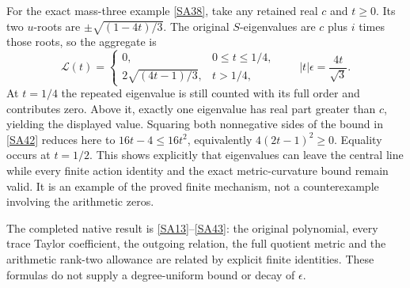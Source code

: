 \documentclass[11pt]{article}
\begin{document}
For the exact mass-three example \eqref{SA38}, take
any retained real $c$ and $t\geq0$. Its two $u$-roots
are $\pm\sqrt{(1-4t)/3}$. The original $S$-eigenvalues
are $c$ plus $i$ times those roots, so the aggregate is
\begin{equation}\tag{SA43}\label{SA43}
\mathcal L(t)=
\begin{cases}
0,&0\leq t\leq1/4,\\
2\sqrt{(4t-1)/3},&t>1/4,
\end{cases}
\qquad |t|\epsilon=\frac{4t}{\sqrt3}.
\end{equation}
At $t=1/4$ the repeated eigenvalue is still counted with
its full order and contributes zero. Above it, exactly
one eigenvalue has real part greater than $c$, yielding
the displayed value. Squaring both nonnegative sides
of the bound in \eqref{SA42} reduces here to
$16t-4\leq16t^2$, equivalently
$4(2t-1)^2\geq0$. Equality occurs at $t=1/2$.
This shows explicitly that eigenvalues can leave the
central line while every finite action identity and
the exact metric-curvature bound remain valid.
It is an example of the proved finite mechanism,
not a counterexample involving the arithmetic zeros.

The completed native result is \eqref{SA13}--\eqref{SA43}:
the original polynomial, every trace Taylor coefficient,
the outgoing relation, the full quotient metric and
the arithmetic rank-two allowance are related by
explicit finite identities. These formulas do not
supply a degree-uniform bound or decay of $\epsilon$.
\end{document}
